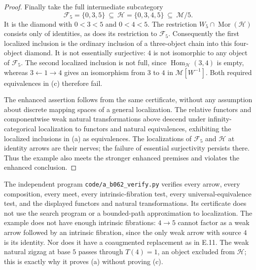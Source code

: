 \begin{proof}
Finally take the full intermediate subcategory
\[
 \mathcal F_5=\{0,3,5\}\ \subseteq\
 \mathcal H=\{0,3,4,5\}\ \subseteq\ \mathcal M/5.
\]
It is the diamond with $0<3<5$ and $0<4<5$. The restriction $W_5\cap\operatorname{Mor}(\mathcal H)$ consists only of identities, as does its restriction to $\mathcal F_5$. Consequently the first localized inclusion is the ordinary inclusion of a three-object chain into this four-object diamond. It is not essentially surjective: $4$ is not isomorphic to any object of $\mathcal F_5$. The second localized inclusion is not full, since $\operatorname{Hom}_{\mathcal H}(3,4)$ is empty, whereas $3\leftarrow1\to4$ gives an isomorphism from $3$ to $4$ in $\mathcal M[W^{-1}]$. Both required equivalences in (c) therefore fail.

The enhanced assertion follows from the same certificate, without any assumption about discrete mapping spaces of a general localization. The relative functors and componentwise weak natural transformations above descend under infinity-categorical localization to functors and natural equivalences, exhibiting the localized inclusions in (a) as equivalences. The localizations of $\mathcal F_5$ and $\mathcal H$ at identity arrows are their nerves; the failure of essential surjectivity persists there. Thus the example also meets the stronger enhanced premises and violates the enhanced conclusion.
\end{proof}

The independent program \texttt{code/a\_b062\_verify.py} verifies every arrow, every composition, every meet, every intrinsic-fibration test, every universal-equivalence test, and the displayed functors and natural transformations. Its certificate does not use the search program or a bounded-path approximation to localization. The example does not have enough intrinsic fibrations: $4\to5$ cannot factor as a weak arrow followed by an intrinsic fibration, since the only weak arrow with source $4$ is its identity. Nor does it have a coaugmented replacement as in E.11. The weak natural zigzag at base $5$ passes through $T(4)=1$, an object excluded from $\mathcal H$; this is exactly why it proves (a) without proving (c).
